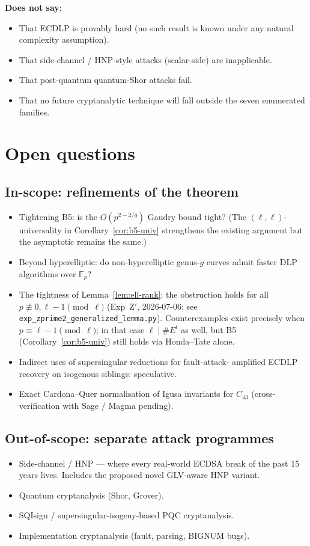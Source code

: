 \documentclass[11pt,a4paper]{article}
\theoremstyle{definition}
\newcommand{\FF}{\mathbb{F}}
\begin{document}
\textbf{Does not say}:
\begin{itemize}
\item That ECDLP is provably hard (no such result is known under
      any natural complexity assumption).
\item That side-channel / HNP-style attacks (scalar-side) are
      inapplicable.
\item That post-quantum quantum-Shor attacks fail.
\item That no future cryptanalytic technique will fall outside the
      seven enumerated families.
\end{itemize}

\section{Open questions}

\subsection*{In-scope: refinements of the theorem}
\begin{itemize}
\item Tightening B5: is the $O(p^{2 - 2/g})$ Gaudry bound tight?
      (The $(\ell,\ell)$-universality in Corollary~\ref{cor:b5-univ}
      strengthens the existing argument but the asymptotic remains
      the same.)
\item Beyond hyperelliptic: do non-hyperelliptic genus-$g$ curves
      admit faster DLP algorithms over $\FF_p$?
\item The tightness of Lemma~\ref{lem:ell-rank}: the obstruction holds
      for all $p \not\equiv 0, \ell{-}1 \pmod\ell$ (Exp~Z$'$, 2026-07-06;
      see \texttt{exp\_zprime2\_generalized\_lemma.py}).
      Counterexamples exist precisely when $p \equiv \ell{-}1 \pmod\ell$;
      in that case $\ell \mid \#E^t$ as well, but B5 (Corollary~\ref{cor:b5-univ})
      still holds via Honda--Tate alone.
\item Indirect uses of supersingular reductions for fault-attack-
      amplified ECDLP recovery on isogenous siblings: speculative.
\item Exact Cardona--Quer normalisation of Igusa invariants for
      $C_{43}$ (cross-verification with Sage / Magma pending).
\end{itemize}

\subsection*{Out-of-scope: separate attack programmes}
\begin{itemize}
\item Side-channel / HNP --- where every real-world ECDSA break of
      the past 15 years lives. Includes the proposed novel
      GLV-aware HNP variant.
\item Quantum cryptanalysis (Shor, Grover).
\item SQIsign / supersingular-isogeny-based PQC cryptanalysis.
\item Implementation cryptanalysis (fault, parsing, BIGNUM bugs).
\end{itemize}
\end{document}
